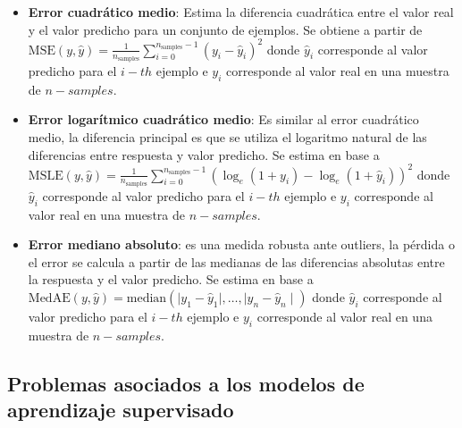 \begin{itemize}
	\item \textbf{Error cuadrático medio}: Estima la diferencia cuadrática entre el valor real y el valor predicho para un conjunto de ejemplos. Se obtiene a partir de $\text{MSE}(y, \hat{y}) = \frac{1}{n_\text{samples}} \sum_{i=0}^{n_\text{samples} - 1} (y_i - \hat{y}_i)^2$ donde $\hat{y}_i$ corresponde al valor predicho para el $i-th$ ejemplo e $y_{i}$ corresponde al valor real en una muestra de $n-samples$.
	
	\item \textbf{Error logarítmico cuadrático medio}: Es similar al error cuadrático medio, la diferencia principal es que se utiliza el logaritmo natural de las diferencias entre respuesta y valor predicho. Se estima en base a $\text{MSLE}(y, \hat{y}) = \frac{1}{n_\text{samples}} \sum_{i=0}^{n_\text{samples} - 1} (\log_e (1 + y_i) - \log_e (1 + \hat{y}_i) )^2$ donde $\hat{y}_i$ corresponde al valor predicho para el $i-th$ ejemplo e $y_{i}$ corresponde al valor real en una muestra de $n-samples$.
	
	\item \textbf{Error mediano absoluto}: es una medida robusta ante outliers, la pérdida o el error se calcula a partir de las medianas de las diferencias absolutas entre la respuesta y el valor predicho. Se estima en base a $\text{MedAE}(y, \hat{y}) = \text{median}(\mid y_1 - \hat{y}_1 \mid, \ldots, \mid y_n - \hat{y}_n \mid)$ donde $\hat{y}_i$ corresponde al valor predicho para el $i-th$ ejemplo e $y_{i}$ corresponde al valor real en una muestra de $n-samples$.
	  
	
\end{itemize}

\subsection{Problemas asociados a los modelos de aprendizaje supervisado}\label{ProblemasModelos}

